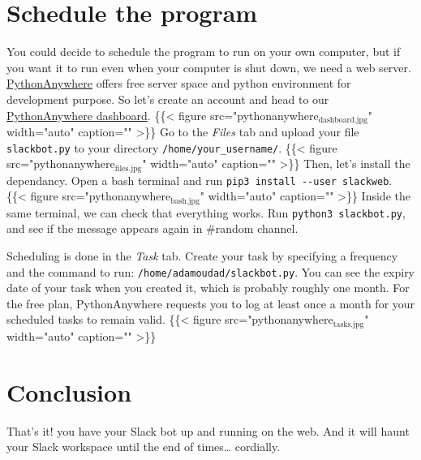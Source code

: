 \documentclass[11pt]{article}
\begin{document}
\section{Schedule the program}
\label{sec:org757e4ee}
You could decide to schedule the program to run on your own computer, but if you want it to run even when your computer is shut down, we need a web server. \href{https://www.pythonanywhere.com/}{PythonAnywhere} offers free server space and python environment for development purpose. So let's create an account and head to our \href{https://www.pythonanywhere.com/dashboard/}{PythonAnywhere dashboard}.
\{\{< figure src="pythonanywhere\(_{\text{dashboard.jpg}}\)" width="auto" caption="" >\}\}
Go to the \emph{Files} tab and upload your file \texttt{slackbot.py} to your directory \texttt{/home/your\_username/}.
\{\{< figure src="pythonanywhere\(_{\text{files.jpg}}\)" width="auto" caption="" >\}\}
Then, let's install the dependancy. Open a bash terminal and run \texttt{pip3 install -{}-user slackweb}.
\{\{< figure src="pythonanywhere\(_{\text{bash.jpg}}\)" width="auto" caption="" >\}\}
Inside the same terminal, we can check that everything works. Run \texttt{python3 slackbot.py}, and see if the message appears again in \#random channel.

Scheduling is done in the \emph{Task} tab. Create your task by specifying a frequency and the command to run: \texttt{/home/adamoudad/slackbot.py}. You can see the expiry date of your task when you created it, which is probably roughly one month. For the free plan, PythonAnywhere requests you to log at least once a month for your scheduled tasks to remain valid.
\{\{< figure src="pythonanywhere\(_{\text{tasks.jpg}}\)" width="auto" caption="" >\}\}
\section{Conclusion}
\label{sec:org9747f35}
That's it! you have your Slack bot up and running on the web. And it will haunt your Slack workspace until the end of times\ldots{} cordially.
\end{document}
